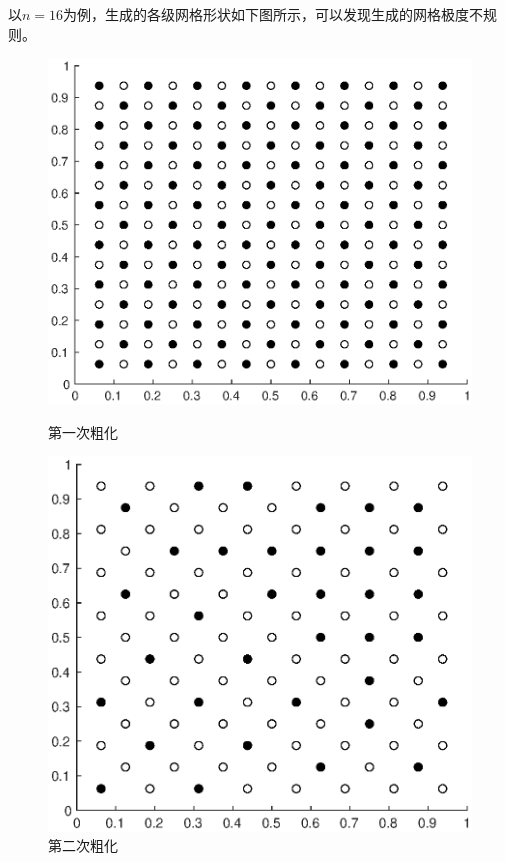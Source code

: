 \documentclass[lang=cn,10pt]{elegantbook}
\begin{document}
以$n=16$为例，生成的各级网格形状如下图所示，可以发现生成的网格极度不规则。
\begin{figure}[H]
  \centering
  \begin{minipage}[t]{0.32\linewidth}
      \centering
      \includegraphics[width=\linewidth]{figure/4-1-1.eps}
      \caption*{\small 第一次粗化}
  \end{minipage}
  \hspace{.5em}
  \begin{minipage}[t]{0.32\linewidth}
    \centering
    \includegraphics[width=0.9\linewidth]{figure/4-2-1.eps}
    \caption*{\small 第二次粗化}

\end{minipage}
\end{figure}
\end{document}
